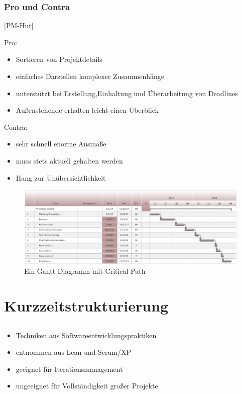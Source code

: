 \documentclass[%
	handout
]{beamer}
\newcommand{\pmhut}{[PM-Hut]}
\begin{document}
		\begin{frame}
			\frametitle{Pro und Contra}
			\pmhut\\
			\begin{minipage}[t]{.48\textwidth}
				Pro:
				\begin{itemize}
					\item Sortieren von Projektdetails
					\item einfaches Darstellen komplexer Zusammenhänge
					\item unterstützt bei Erstellung,Einhaltung und Überarbeitung von Deadlines
					\item Außenstehende erhalten leicht einen Überblick
				\end{itemize}
			\end{minipage}
			\begin{minipage}[t]{.48\textwidth}
				Contra:
				\begin{itemize}
					\item sehr schnell enorme Ausmaße
					\item muss stets aktuell gehalten werden
					\item Hang zur Unübersichtlichkeit
				\end{itemize}
			\end{minipage}
		\end{frame}
		
		\begin{frame}
			\begin{figure}
				\begin{center}
					\includegraphics[scale=.3]{../images/gantt2.png}
					\caption{Ein Gantt-Diagramm mit Critical Path}
					\label{img:gantt}
				\end{center}
			\end{figure}
		\end{frame}
		
\section{Kurzzeitstrukturierung}
	\subsection{}
		\begin{frame}
			\begin{itemize}
				\item Techniken aus Softwareentwicklungspraktiken
				\item entnommen aus Lean und Scrum/XP
				\item geeignet für Iterationsmanagement
				\item ungeeignet für Vollständigkeit großer Projekte
			\end{itemize}
		\end{frame}
\end{document}
